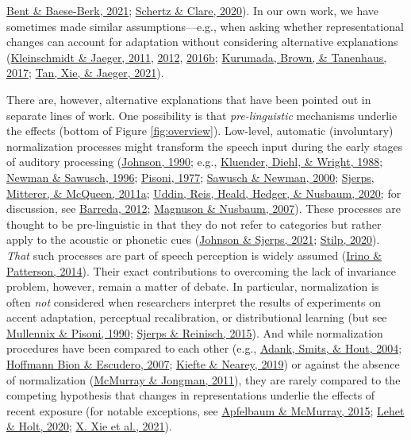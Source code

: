 \documentclass[
  11pt,
  english,
  man,floatsintext]{apa6}
\begin{document}
\protect\hyperlink{ref-bent-baeseberk2021}{Bent \& Baese-Berk, 2021}; \protect\hyperlink{ref-schertz-clare2020}{Schertz \& Clare, 2020}). In our own work, we have sometimes made similar assumptions---e.g., when asking whether representational changes can account for adaptation without considering alternative explanations (\protect\hyperlink{ref-kleinschmidt-jaeger2011}{Kleinschmidt \& Jaeger, 2011}, \protect\hyperlink{ref-kleinschmidt-jaeger2012}{2012}, \protect\hyperlink{ref-kleinschmidt-jaeger2016cogsci}{2016b}; \protect\hyperlink{ref-kurumada2017}{Kurumada, Brown, \& Tanenhaus, 2017}; \protect\hyperlink{ref-tan2021}{Tan, Xie, \& Jaeger, 2021}).

There are, however, alternative explanations that have been pointed out in separate lines of work. One possibility is that \emph{pre-linguistic} mechanisms underlie the effects (bottom of Figure \ref{fig:overview}). Low-level, automatic (involuntary) normalization processes might transform the speech input during the early stages of auditory processing (\protect\hyperlink{ref-johnson1990}{Johnson, 1990}; e.g., \protect\hyperlink{ref-kluender1988}{Kluender, Diehl, \& Wright, 1988}; \protect\hyperlink{ref-newman-sawusch1996}{Newman \& Sawusch, 1996}; \protect\hyperlink{ref-pisoni1977}{Pisoni, 1977}; \protect\hyperlink{ref-sawusch-newman2000}{Sawusch \& Newman, 2000}; \protect\hyperlink{ref-sjerps2011}{Sjerps, Mitterer, \& McQueen, 2011a}; \protect\hyperlink{ref-uddin2020}{Uddin, Reis, Heald, Hedger, \& Nusbaum, 2020}; for discussion, see \protect\hyperlink{ref-barreda2012}{Barreda, 2012}; \protect\hyperlink{ref-magnuson-nusbaum2007}{Magnuson \& Nusbaum, 2007}). These processes are thought to be pre-linguistic in that they do not refer to categories but rather apply to the acoustic or phonetic cues (\protect\hyperlink{ref-johnson-sjerps2021}{Johnson \& Sjerps, 2021}; \protect\hyperlink{ref-stilp2020}{Stilp, 2020}). \emph{That} such processes are part of speech perception is widely assumed (\protect\hyperlink{ref-irino-patterson2014}{Irino \& Patterson, 2014}). Their exact contributions to overcoming the lack of invariance problem, however, remain a matter of debate. In particular, normalization is often \emph{not} considered when researchers interpret the results of experiments on accent adaptation, perceptual recalibration, or distributional learning (but see \protect\hyperlink{ref-mullennix-pisoni1990}{Mullennix \& Pisoni, 1990}; \protect\hyperlink{ref-sjerps-reinisch2015}{Sjerps \& Reinisch, 2015}). And while normalization procedures have been compared to each other (e.g., \protect\hyperlink{ref-adank2004}{Adank, Smits, \& Hout, 2004}; \protect\hyperlink{ref-hoffmanbion-escudero2007}{Hoffmann Bion \& Escudero, 2007}; \protect\hyperlink{ref-kiefte-nearey2019}{Kiefte \& Nearey, 2019}) or against the absence of normalization (\protect\hyperlink{ref-mcmurray-jongman2011}{McMurray \& Jongman, 2011}), they are rarely compared to the competing hypothesis that changes in representations underlie the effects of recent exposure (for notable exceptions, see \protect\hyperlink{ref-apfelbaum-mcmurray2015}{Apfelbaum \& McMurray, 2015}; \protect\hyperlink{ref-lehet-holt2020}{Lehet \& Holt, 2020}; \protect\hyperlink{ref-xie2021cognition}{X. Xie et al., 2021}).
\end{document}
